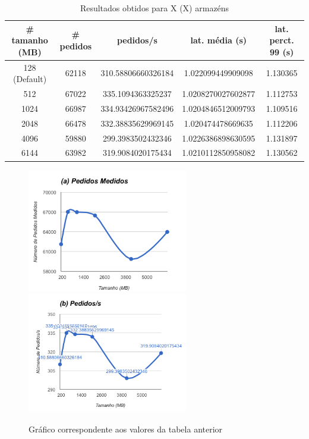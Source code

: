 \begin{table}[!h]
\center
\small
\begin{tabular}{|c|c|c|c|c|}
\hline
\textbf{\# tamanho (MB)} & \textbf{\# pedidos} & \textbf{pedidos/s} & \textbf{lat. média (s)} & \textbf{lat. perct. 99 (s)}  \\ \hline
128 (Default) & 62118 & 310.58806660326184 & 1.022099449909098 & 1.130365  \\ \hline
512 & 67022 & 335.1094363325237 & 1.0208270027602877 & 1.112753  \\ \hline
1024 & 66987 & 334.93426967582496 & 1.0204846512009793 & 1.109516  \\ \hline
2048 & 66478 & 332.38835629969145 & 1.020474478669635 & 1.112206  \\ \hline
4096 & 59880 & 299.3983502432346 & 1.0226386898630595 & 1.131897  \\ \hline
6144 & 63982 & 319.9084020175434 & 1.0210112850958082 & 1.130562  \\ \hline
\end{tabular}
\caption{Resultados obtidos para X (X) armazéns}
\end{table}

\begin{figure}[ht!]
\centering
\includegraphics[width=70mm]{img/02_ecs_b.png}
\includegraphics[width=70mm]{img/02_ecs_a.png}
\caption{Gráfico correspondente aos valores da tabela anterior\label{overflow}}
\end{figure}


